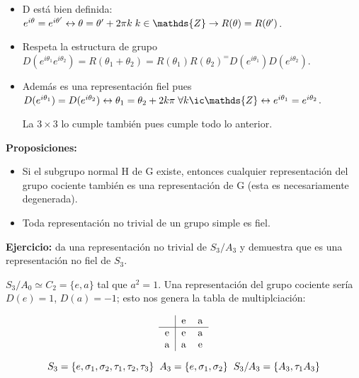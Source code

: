 \documentclass{article}
\begin{document}
    \begin{itemize}
        \item    D está bien definida: $e^{i\theta} =e^{i\theta '} \leftrightarrow \theta =\theta ' + 2\pi k \hspace{0.1cm} k\in \mathds{Z} \to R(\theta)=R(\theta ')$.
    

 \item  Respeta la estructura de grupo $D(e^{i\theta _1}e^{i\theta _2})=R(\theta _1 +\theta _2)=R(\theta _1)R(\theta _2)^=D(e^{i\theta _1})D(e^{i\theta _2})$.
    
   \item Además es una representación fiel pues $D(e^{i\theta _1})=D(e^{i\theta _2})\leftrightarrow \theta _1=\theta _2 +2k\pi \hspace{0.1cm} \forall k\ic \mathds{Z} \leftrightarrow e^{i\theta _1}=e^{i\theta _2}$.
    
    La $3\times 3$ lo cumple también pues cumple todo lo anterior.
    
        \end{itemize}
    
    \bigskip
    \textbf{Proposiciones:}
    
    \begin{itemize}
        \item Si el subgrupo normal H de G existe, entonces cualquier representación del grupo cociente también es una representación de G (esta es necesariamente degenerada).
        \item Toda representación no trivial de un grupo simple es fiel.
    \end{itemize}
    
    \textbf{Ejercicio:} da una representación no trivial de $S_3 / A_3$ y demuestra que es una representación no fiel de $S_3$.
    
    \bigskip
    $S_3/A_0 \simeq C_2=\lbrace e,a \rbrace$ tal que $a^2=1$. Una representación del grupo cociente sería $D(e)=1$, $D(a)=-1$; esto nos genera la tabla de multiplciación:
    
    $$\begin{tabular}[b]{ c | c c }

 & e & a  \\
\hline
e & e & a  \\
a & a  & e  \\

\end{tabular}  $$

$$S_3 = \lbrace e,\sigma _1, \sigma _2 , \tau _1, \tau _2, \tau _3 \rbrace \hspace{0.2cm} A_3=\lbrace e, \sigma _1, \sigma _2 \rbrace \hspace{0.2cm} S_3/A_3 = \lbrace A_3, \tau _1 A_3 \rbrace$$
\end{document}
